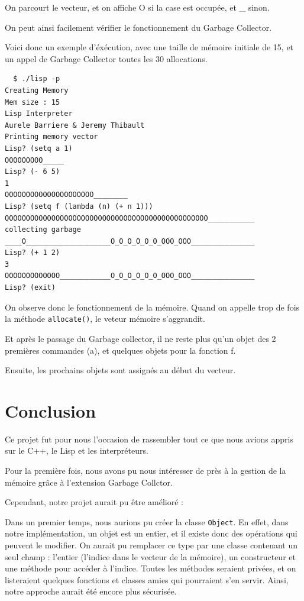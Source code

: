 \documentclass[12pt]{article}
\def\code #1{\lstinline{#1}}
\begin{document}
On parcourt le vecteur, et on affiche O si la case est occupée, et \_ sinon.

On peut ainsi facilement vérifier le fonctionnement du Garbage Collector.

Voici donc un exemple d'éxécution, avec une taille de mémoire initiale de 15, et un appel de Garbage Collector toutes les 30 allocations.

\lstset{language=C++,basicstyle=\ttfamily,breaklines=true, frame=single}
\begin{lstlisting}
  $ ./lisp -p
Creating Memory
Mem size : 15
Lisp Interpreter
Aurele Barriere & Jeremy Thibault
Printing memory vector
Lisp? (setq a 1)
OOOOOOOOO_____
Lisp? (- 6 5)
1
OOOOOOOOOOOOOOOOOOOOO________
Lisp? (setq f (lambda (n) (+ n 1)))
OOOOOOOOOOOOOOOOOOOOOOOOOOOOOOOOOOOOOOOOOOOOOOOO___________
collecting garbage
____O____________________O_O_O_O_O_O_OOO_OOO_______________
Lisp? (+ 1 2)
3
OOOOOOOOOOOOO____________O_O_O_O_O_O_OOO_OOO_______________
Lisp? (exit)
\end{lstlisting}
\lstset{language=C++,basicstyle=\ttfamily,breaklines=true}

On observe donc le fonctionnement de la mémoire. Quand on appelle trop de fois la méthode \code{allocate()}, le veteur mémoire s'aggrandit.

Et après le passage du Garbage collector, il ne reste plus qu'un objet des 2 premières commandes (a), et quelques objets pour la fonction f.

Ensuite, les prochains objets sont assignés au début du vecteur.

\section{Conclusion}

Ce projet fut pour nous l'occasion de rassembler tout ce que nous avions appris sur le C++, le Lisp et les interpréteurs.

Pour la première fois, nous avons pu nous intéresser de près à la gestion de la mémoire grâce à l'extension Garbage Collctor.


Cependant, notre projet aurait pu être amélioré :

Dans un premier temps, nous aurions pu créer la classe \code{Object}.
En effet, dans notre implémentation, un objet est un entier, et il existe donc des opérations qui peuvent le modifier. On aurait pu remplacer ce type par une classe contenant un seul champ : l'entier (l'indice dans le vecteur de la mémoire), un constructeur et une méthode pour accéder à l'indice. Toutes les méthodes seraient privées, et on listeraient quelques fonctions et classes amies qui pourraient s'en servir. Ainsi, notre approche aurait été encore plus sécurisée.
\end{document}
